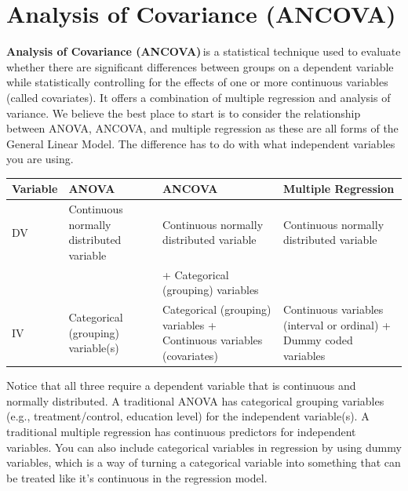 \documentclass[
  letterpaper,
  DIV=11,
  numbers=noendperiod]{scrreprt}
\begin{document}
\section{Analysis of Covariance
(ANCOVA)\,}\label{analysis-of-covariance-ancova}

\textbf{Analysis of Covariance (ANCOVA)}\,is a statistical technique
used to evaluate whether there are significant differences between
groups on a dependent variable while statistically controlling for the
effects of one or more continuous variables (called covariates). It
offers a combination of multiple regression and analysis of variance. We
believe the best place to start is to consider the relationship between
ANOVA, ANCOVA, and multiple regression as these are all forms of the
General Linear Model. The difference has to do with what independent
variables you are using.\,

\begin{longtable}[]{@{}
  >{\raggedright\arraybackslash}p{}
  >{\raggedright\arraybackslash}p{}
  >{\raggedright\arraybackslash}p{}
  >{\raggedright\arraybackslash}p{}@{}}
\toprule\noalign{}
\begin{minipage}[b]{\linewidth}\raggedright
Variable
\end{minipage} & \begin{minipage}[b]{\linewidth}\raggedright
ANOVA
\end{minipage} & \begin{minipage}[b]{\linewidth}\raggedright
ANCOVA
\end{minipage} & \begin{minipage}[b]{\linewidth}\raggedright
Multiple Regression
\end{minipage} \\
\midrule\noalign{}
\endhead
\bottomrule\noalign{}
\endlastfoot
DV & Continuous normally distributed variable & Continuous normally
distributed variable & Continuous normally distributed variable \\
& & + Categorical (grouping) variables & \\
IV & Categorical (grouping) variable(s) & Categorical (grouping)
variables + Continuous variables (covariates) & Continuous variables
(interval or ordinal) + Dummy coded variables \\
\end{longtable}

Notice that all three require a dependent variable that is continuous
and normally distributed. A traditional ANOVA has categorical grouping
variables (e.g., treatment/control, education level) for the independent
variable(s). A traditional multiple regression has continuous predictors
for independent variables. You can also include categorical variables in
regression by using dummy variables, which is a way of turning a
categorical variable into something that can be treated like it's
continuous in the regression model.
\end{document}
